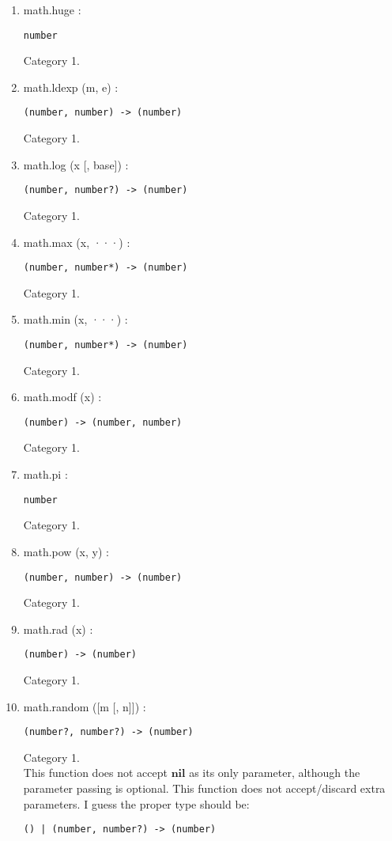 \documentclass{paper}
\newcommand{\Nil}{\mathbf{nil}}
\begin{document}
\begin{enumerate}
\begin{verbatim}
(number) -> (number, number)
\end{verbatim}
Category 1.
\item math.huge :
\begin{verbatim}
number
\end{verbatim}
Category 1.
\item math.ldexp (m, e) :
\begin{verbatim}
(number, number) -> (number)
\end{verbatim}
Category 1.
\item math.log (x [, base]) :
\begin{verbatim}
(number, number?) -> (number)
\end{verbatim}
Category 1.
\item math.max (x, ···) :
\begin{verbatim}
(number, number*) -> (number)
\end{verbatim}
Category 1.
\item math.min (x, ···) :
\begin{verbatim}
(number, number*) -> (number)
\end{verbatim}
Category 1.
\item math.modf (x) :
\begin{verbatim}
(number) -> (number, number)
\end{verbatim}
Category 1.
\item math.pi :
\begin{verbatim}
number
\end{verbatim}
Category 1.
\item math.pow (x, y) :
\begin{verbatim}
(number, number) -> (number)
\end{verbatim}
Category 1.
\item math.rad (x) :
\begin{verbatim}
(number) -> (number)
\end{verbatim}
Category 1.
\item math.random ([m [, n]]) :
\begin{verbatim}
(number?, number?) -> (number)
\end{verbatim}
Category 1.
\\
This function does not accept $\Nil$ as its only parameter,
although the parameter passing is optional.
This function does not accept/discard extra parameters.
I guess the proper type should be:
\begin{verbatim}
() | (number, number?) -> (number)

\end{verbatim}
\end{enumerate}
\end{document}
